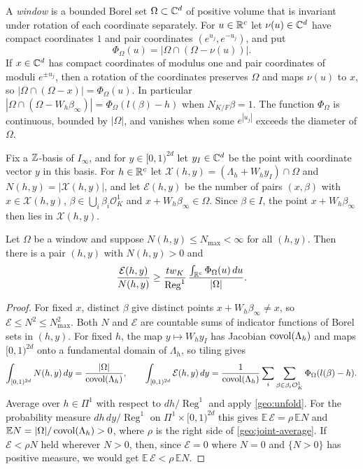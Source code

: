 A \emph{window} is a bounded Borel set $\Omega\subset\mathbb C^d$ of positive
volume that is invariant under rotation of each coordinate separately.
For $u\in\mathbb R^c$ let $\nu(u)\in\mathbb C^d$ have compact coordinates $1$ and
pair coordinates $(e^{u_j},e^{-u_j})$, and put
\[
 \Phi_\Omega(u)=|\Omega\cap(\Omega-\nu(u))|.
\]
If $x\in\mathbb C^d$ has compact coordinates of modulus one and pair
coordinates of moduli $e^{\pm u_j}$, then a rotation of the coordinates
preserves $\Omega$ and maps $\nu(u)$ to $x$, so
$|\Omega\cap(\Omega-x)|=\Phi_\Omega(u)$. In particular
$|\Omega\cap(\Omega-W_h\beta_\infty)|=\Phi_\Omega(l(\beta)-h)$ when
$N_{K/F}\beta=1$. The function $\Phi_\Omega$ is continuous, bounded by
$|\Omega|$, and vanishes when some $e^{|u_j|}$ exceeds the diameter of
$\Omega$.

Fix a $\mathbb Z$-basis of $I_\infty$, and for $y\in[0,1)^{2d}$ let
$y_I\in\mathbb C^d$ be the point with coordinate vector $y$ in this basis. For
$h\in\mathbb R^c$ let $\mathcal X(h,y)=(\Lambda_h+W_hy_I)\cap\Omega$ and
$N(h,y)=|\mathcal X(h,y)|$, and let $\mathcal E(h,y)$ be the number of
pairs $(x,\beta)$ with $x\in\mathcal X(h,y)$,
$\beta\in\bigcup_i\beta_i\mathcal O_K^1$ and $x+W_h\beta_\infty\in\Omega$.
Since $\beta\in I$, the point $x+W_h\beta_\infty$ then lies in
$\mathcal X(h,y)$.

\begin{lemma}\label{geo:joint-average-lemma}
Let $\Omega$ be a window and suppose $N(h,y)\le N_{\max}<\infty$ for
all $(h,y)$. Then there is a pair $(h,y)$ with $N(h,y)>0$ and
\begin{equation}\label{geo:joint-average}
 \frac{\mathcal E(h,y)}{N(h,y)}\ge
 \frac{tw_K}{\operatorname{Reg}^1}\,
 \frac{\int_{\mathbb R^c}\Phi_\Omega(u)\,du}{|\Omega|}.
\end{equation}
\end{lemma}

\begin{proof}
For fixed $x$, distinct $\beta$ give distinct points
$x+W_h\beta_\infty\ne x$, so $\mathcal E\le N^2\le N_{\max}^2$. Both $N$
and $\mathcal E$ are countable sums of indicator functions of Borel sets
in $(h,y)$. For fixed $h$, the map $y\mapsto W_hy_I$ has Jacobian
$\operatorname{covol}(\Lambda_h)$ and maps $[0,1)^{2d}$ onto a fundamental domain of
$\Lambda_h$, so tiling gives
\[
 \int_{[0,1)^{2d}}N(h,y)\,dy=\frac{|\Omega|}{\operatorname{covol}(\Lambda_h)},\qquad
 \int_{[0,1)^{2d}}\mathcal E(h,y)\,dy
 =\frac1{\operatorname{covol}(\Lambda_h)}\sum_{i}\sum_{\beta\in\beta_i\mathcal O_K^1}
 \Phi_\Omega(l(\beta)-h).
\]
Average over $h\in\Pi^1$ with respect to $dh/\operatorname{Reg}^1$ and
apply \eqref{geo:unfold}. For the probability measure
$dh\,dy/\operatorname{Reg}^1$ on $\Pi^1\times[0,1)^{2d}$ this gives
$\mathbb E\,\mathcal E=\rho\,\mathbb EN$ and
$\mathbb EN=|\Omega|/\operatorname{covol}(\Lambda_h)>0$, where $\rho$ is the right
side of \eqref{geo:joint-average}. If $\mathcal E<\rho N$ held wherever
$N>0$, then, since $\mathcal E=0$ where $N=0$ and $\{N>0\}$ has positive
measure, we would get $\mathbb E\,\mathcal E<\rho\,\mathbb EN$.
\end{proof}

